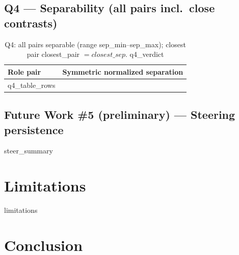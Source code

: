 \documentclass[11pt]{article}
\begin{document}
\subsection{Q4 — Separability (all pairs incl.\ close contrasts)}
\begin{table}[h]\centering
\begin{tabular}{lc}\toprule
Role pair & Symmetric normalized separation \\ \midrule
{{q4\_table\_rows}} \\ \bottomrule
\end{tabular}\caption{Q4: all pairs separable (range {{sep\_min}}--{{sep\_max}}); closest pair {{closest\_pair}} $={{closest\_sep}}$. {{q4\_verdict}}}\end{table}

\subsection{Future Work \#5 (preliminary) — Steering persistence}
{{steer\_summary}}

\section{Limitations}
{{limitations}}

\section{Conclusion}


% 
\end{document}
